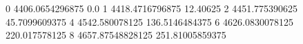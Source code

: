 0 4406.0654296875 0.0
1 4418.4716796875 12.40625
2 4451.775390625 45.7099609375
4 4542.580078125 136.5146484375
6 4626.0830078125 220.017578125
8 4657.87548828125 251.81005859375
